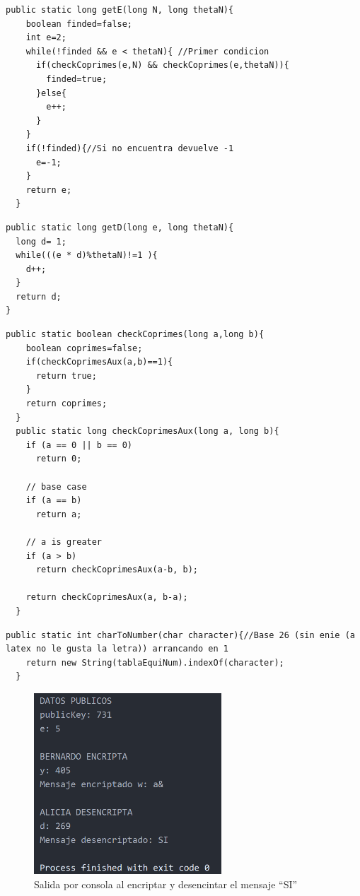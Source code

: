 \begin{lstlisting}[style=java,caption= Metodo getE ]
  public static long getE(long N, long thetaN){
    boolean finded=false;
    int e=2;
    while(!finded && e < thetaN){ //Primer condicion
      if(checkCoprimes(e,N) && checkCoprimes(e,thetaN)){
        finded=true;
      }else{
        e++;
      }
    }
    if(!finded){//Si no encuentra devuelve -1
      e=-1;
    }
    return e;
  }

\end{lstlisting}

\begin{lstlisting}[style=java,caption= Metodo getD ]
  public static long getD(long e, long thetaN){ 
  long d= 1;
  while(((e * d)%thetaN)!=1 ){
    d++;
  }
  return d;
}

\end{lstlisting}

\begin{lstlisting}[style=java,caption= Metodo checkCoprimes]
  public static boolean checkCoprimes(long a,long b){
    boolean coprimes=false;
    if(checkCoprimesAux(a,b)==1){
      return true;
    }
    return coprimes;
  }
  public static long checkCoprimesAux(long a, long b){
    if (a == 0 || b == 0)
      return 0;

    // base case
    if (a == b)
      return a;

    // a is greater
    if (a > b)
      return checkCoprimesAux(a-b, b);

    return checkCoprimesAux(a, b-a);
  }

\end{lstlisting}

\begin{lstlisting}[style=java,caption= Metodo charToNumber ]
  public static int charToNumber(char character){//Base 26 (sin enie (a latex no le gusta la letra)) arrancando en 1
    return new String(tablaEquiNum).indexOf(character);
  }

\end{lstlisting}

\begin{figure}[!htb]
  \centering
  \includegraphics[width=7cm, scale=1]{Images/Punto3/SalidaConsolaCrypto.png}
  \caption{Salida por consola al encriptar y desencintar el mensaje ``SI''}
\end{figure}